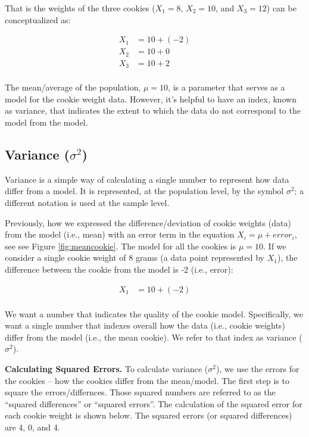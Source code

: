 \documentclass[
]{krantz}
\begin{document}
That is the weights of the three cookies (\(X_1 = 8\), \(X_2 = 10\), and \(X_3 = 12\)) can be conceptualized as:

\[
\begin{aligned} 
X_1 &= 10 + (-2) \\
X_2 &= 10 + 0 \\
X_3 &= 10 + 2 \\
\end{aligned} 
\]

The mean/average of the population, \(\mu = 10\), is a parameter that serves as a model for the cookie weight data. However, it's helpful to have an index, known as variance, that indicates the extent to which the data do not correspond to the model from the model.

\hypertarget{variance-sigma2}{%
\subsection{\texorpdfstring{Variance (\(\sigma^2\))}{Variance (\textbackslash sigma\^{}2)}}\label{variance-sigma2}}

Variance is a simple way of calculating a single number to represent how data differ from a model. It is represented, at the population level, by the symbol \(\sigma^2\); a different notation is used at the sample level.

Previously, how we expressed the difference/deviation of cookie weights (data) from the model (i.e., mean) with an error term in the equation \(X_i = \mu +error_i\), see see Figure \ref{fig:meancookie}. The model for all the cookies is \(\mu = 10\). If we consider a single cookie weight of 8 grams (a data point represented by \(X_1\)), the difference between the cookie from the model is -2 (i.e., error):

\[
\begin{aligned} 
X_1 &= 10 + (-2) \\
\end{aligned} 
\]

We want a number that indicates the quality of the cookie model. Specifically, we want a single number that indexes overall how the data (i.e., cookie weights) differ from the model (i.e., the mean cookie). We refer to that index as variance (\(\sigma^2\)).

\textbf{Calculating Squared Errors.} To calculate variance (\(\sigma^2\)), we use the errors for the cookies -- how the cookies differ from the mean/model. The first step is to square the errors/differnces. Those squared numbers are referred to as the ``squared differences'' or ``squared errors''. The calculation of the squared error for each cookie weight is shown below. The squared errors (or squared differences) are 4, 0, and 4.
\end{document}
